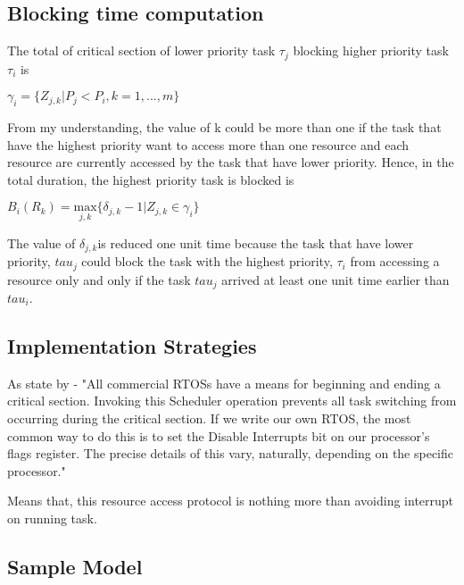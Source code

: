 \subsection{Blocking time computation}

	The total of critical section of lower priority task $\tau_{j}$ blocking higher priority task $\tau_{i}$ is

\begin{center}
$ \gamma_{i}=\{Z_{j,k} | P_{j}<P_{i}, k=1,...,m \} $ \cite{b5}
\end{center}

From my understanding, the value of k could be more than one if the task that have the highest priority want to access more than one resource and each resource are currently accessed by the task that have lower priority. Hence, in the total duration, the highest priority task is blocked is

\begin{center}

$B_{i}(R_{k})=\underset{j,k}{\mathrm{max}} \{ \delta_{j,k}-1 | Z_{j,k} \in \gamma_{i}\}  $ \cite{b5}
\end{center}

The value of $\delta_{j,k}$is reduced one unit time because the task that have lower priority, $tau_{j}$ could block the task with the highest priority, $\tau_{i}$ from accessing a resource only and only if the task $tau_{j}$  arrived at least one unit time earlier than $tau_{i}$.

\subsection{Implementation Strategies}

As state by \cite{b6} - "All commercial RTOSs have a means for beginning and ending a critical section. Invoking this Scheduler operation prevents all task switching from occurring during the critical section. If we write our own RTOS, the most common way to do this is to set the Disable Interrupts bit on our processor's flags register. The precise details of this vary, naturally, depending on the specific processor."

Means that, this resource access protocol is nothing more than avoiding interrupt on running task.

\subsection{Sample Model}

